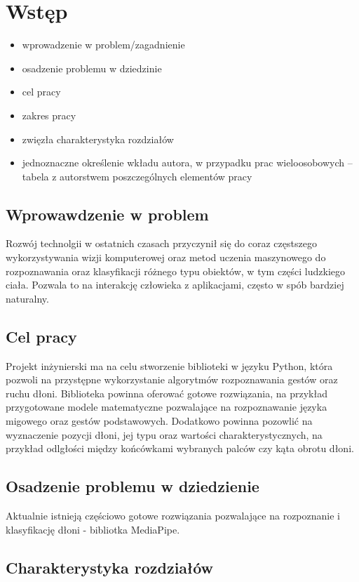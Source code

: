 \chapter{Wstęp}
\begin{itemize}
\item wprowadzenie w problem/zagadnienie
\item osadzenie problemu w dziedzinie
\item cel pracy
\item zakres pracy
\item zwięzła charakterystyka rozdziałów
\item jednoznaczne określenie wkładu autora, w przypadku prac wieloosobowych – tabela z autorstwem poszczególnych elementów pracy
\end{itemize}

\newpage

\section{Wprowawdzenie w problem}
\quad Rozwój technolgii w ostatnich czasach przyczynił się do coraz częstszego wykorzystywania wizji komputerowej oraz metod uczenia maszynowego do rozpoznawania oraz klasyfikacji różnego typu obiektów, w tym części ludzkiego ciała. Pozwala to na interakcję człowieka z aplikacjami, często w spób bardziej naturalny. 

\section{Cel pracy}
Projekt inżynierski ma na celu stworzenie biblioteki w języku Python, która pozwoli na przystępne wykorzystanie algorytmów rozpoznawania gestów oraz ruchu dłoni. Biblioteka powinna oferować gotowe rozwiązania, na przykład przygotowane modele matematyczne pozwalające na rozpoznawanie języka migowego oraz gestów podstawowych. Dodatkowo powinna pozowlić na wyznaczenie pozycji dłoni, jej typu oraz wartości charakterystycznych, na przykład odlgłości między końcówkami wybranych palców czy kąta obrotu dłoni. 

\section{Osadzenie problemu w dziedzienie}
\quad Aktualnie istnieją częściowo gotowe rozwiązania pozwalające na rozpoznanie i klasyfikację dłoni - bibliotka MediaPipe. 

\section {Charakterystyka rozdziałów}

